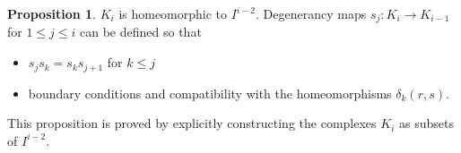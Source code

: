 \documentclass{beamer}
\theoremstyle{definition}
\newtheorem{prop}[teorema]{Proposition}
\begin{document}
\begin{frame}
\begin{prop}
$K_i$ is homeomorphic to $I^{i-2}$. Degenerancy maps $s_j:K_i\to K_{i-1}$ for $1\leq j\leq i$ can be defined so that 
\begin{itemize}
\item $s_js_k=s_ks_{j+1}$ for $k\leq j$
\item boundary conditions and compatibility with the homeomorphisms $\delta_k(r,s)$.

\end{itemize}
\end{prop}\pause

This proposition is proved by explicitly constructing the complexes $K_i$ as subsets of $I^{i-2}$.
\end{frame}
\end{document}
